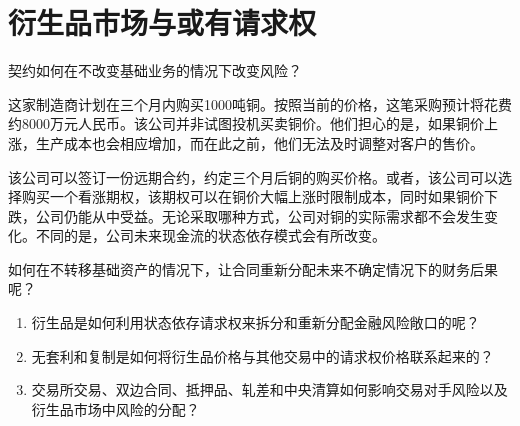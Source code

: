 \chapter{衍生品市场与或有请求权}
\label{chap:Derivatives_Markets_and_Contingent_Claims}

\begin{openingcase}{契约如何在不改变基础业务的情况下改变风险？}

这家制造商计划在三个月内购买1000吨铜。按照当前的价格，这笔采购预计将花费约8000万元人民币。该公司并非试图投机买卖铜价。他们担心的是，如果铜价上涨，生产成本也会相应增加，而在此之前，他们无法及时调整对客户的售价。

该公司可以签订一份远期合约，约定三个月后铜的购买价格。或者，该公司可以选择购买一个看涨期权，该期权可以在铜价大幅上涨时限制成本，同时如果铜价下跌，公司仍能从中受益。无论采取哪种方式，公司对铜的实际需求都不会发生变化。不同的是，公司未来现金流的状态依存模式会有所改变。

如何在不转移基础资产的情况下，让合同重新分配未来不确定情况下的财务后果呢？

\end{openingcase}



\begin{tcolorbox}[
  enhanced,
  colback=FinanceBlue!6,
  colframe=FinanceBlue,
  boxrule=0.6pt,
  sharp corners,
  left=8pt,
  right=8pt,
  top=7pt,
  bottom=7pt,
  before skip=1em,
  after skip=1.6em,
  title=\textbf{核心问题},
  coltitle=white,
  colbacktitle=FinanceBlue,
  fonttitle=\bfseries,
  attach boxed title to top left={xshift=6pt,yshift=-2mm},
  boxed title style={
    boxrule=0pt,
    sharp corners,
    left=5pt,
    right=5pt,
    top=2pt,
    bottom=2pt
  }
]
\begin{enumerate}[
  leftmargin=*,
  label=\textcolor{FinanceBlue}{\textbf{\arabic*.}},
  itemsep=0.55em,
  topsep=0.2em
]


\item 衍生品是如何利用状态依存请求权来拆分和重新分配金融风险敞口的呢？

\item 无套利和复制是如何将衍生品价格与其他交易中的请求权价格联系起来的？

\item 交易所交易、双边合同、抵押品、轧差和中央清算如何影响交易对手风险以及衍生品市场中风险的分配？


\end{enumerate}
\end{tcolorbox}

